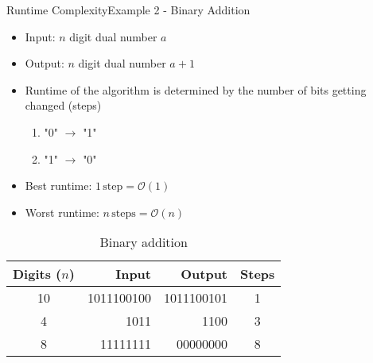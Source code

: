 
\begin{frame}{Runtime Complexity}{Example 2 - Binary Addition}
  \begin{itemize}
    \item
      Input: $n$ digit dual number $a$
    \item
      Output: $n$ digit dual number $a + 1$
    \item<2->
      Runtime of the algorithm is determined by the number of bits getting
      changed (steps)
      \begin{enumerate}
        \item "0" $\to$ "1"
        \item "1" $\to$ "0"
      \end{enumerate}
    \item<3->
      {\color{Mittel-Blau}Best runtime:}
      $1\,\text{step} = \mathcal{O}(1)$
    \item<3->
      {\color{Mittel-Blau}Worst runtime:}
      $n\,\text{steps} = \mathcal{O}(n)$
  \end{itemize}
  \vspace{-1.0em}%
  \begin{table}[!h]%
    \caption{Binary addition}%
    \label{tab:runtime:binary_addition}%
    \begin{tabular}{crrc}%
      Digits ($n$) & Input & Output & Steps\\
      \midrule
      10 & 1011100100 & 1011100101 & 1\\
      4 & 1011 & 1100 & 3\\
      8 & 11111111 & 00000000 & 8
    \end{tabular}
  \end{table}
\end{frame}


